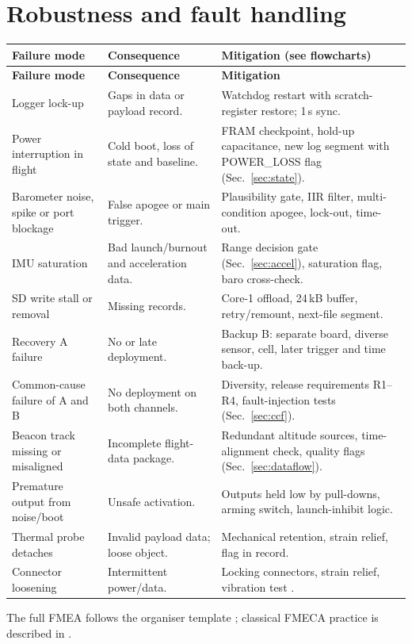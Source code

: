 \section{Robustness and fault handling}
\small
{}
\begin{longtable}{@{}L{34mm}L{50mm}L{62mm}@{}}
\toprule{}\textbf{Failure mode}&\textbf{Consequence}&\textbf{Mitigation (see flowcharts)}\\\midrule\endfirsthead
\toprule{}\textbf{Failure mode}&\textbf{Consequence}&\textbf{Mitigation}\\\midrule\endhead
\bottomrule\endlastfoot
Logger lock-up & Gaps in data or payload record. & Watchdog restart with scratch-register restore; 1\,s sync.\\
Power interruption in flight & Cold boot, loss of state and baseline. & FRAM checkpoint, hold-up capacitance, new log segment with POWER\_LOSS flag (Sec.~\ref{sec:state}).\\
Barometer noise, spike or port blockage & False apogee or main trigger. & Plausibility gate, IIR filter, multi-condition apogee, lock-out, time-out.\\
IMU saturation & Bad launch/burnout and acceleration data. & Range decision gate (Sec.~\ref{sec:accel}), saturation flag, baro cross-check.\\
SD write stall or removal & Missing records. & Core-1 offload, 24\,kB buffer, retry/remount, next-file segment.\\
Recovery A failure & No or late deployment. & Backup B: separate board, diverse sensor, cell, later trigger and time back-up.\\
Common-cause failure of A and B & No deployment on both channels. & Diversity, release requirements R1--R4, fault-injection tests (Sec.~\ref{sec:ccf}).\\
Beacon track missing or misaligned & Incomplete flight-data package. & Redundant altitude sources, time-alignment check, quality flags (Sec.~\ref{sec:dataflow}).\\
Premature output from noise/boot & Unsafe activation. & Outputs held low by pull-downs, arming switch, launch-inhibit logic.\\
Thermal probe detaches & Invalid payload data; loose object. & Mechanical retention, strain relief, flag in record.\\
Connector loosening & Intermittent power/data. & Locking connectors, strain relief, vibration test \cite{rtc2027app03}.\\
\end{longtable}
\normalsize
The full FMEA follows the organiser template \cite{rtc2027app12}; classical FMECA practice is described in \cite{mil1629a}.

